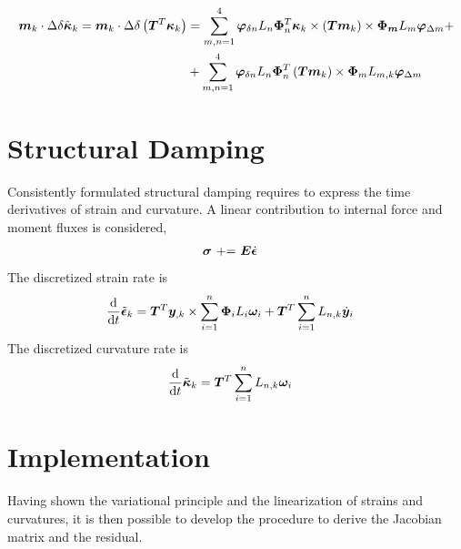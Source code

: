\begin{equation}
\begin{split}
\bm{m}_k \cdot \Delta \delta \tilde{\bm{\kappa}}_k =
\bm{m}_k \cdot \Delta \delta \left( \bm{T}^T \bm{\kappa}_k \right) & =
\sum_{m,n=1}^{4} \bm{\varphi}_{\delta n} L_n \bm{\Phi}_n^T \bm{\kappa}_k \times \left( \bm{T} \bm{m}_k \right) \times \bm{\Phi_{m}} L_m \bm{\varphi}_{\Delta m} + \\
&+\sum_{m,n=1}^{4} \bm{\varphi}_{\delta n} L_n \bm{\Phi}_n^T \left( \bm{T} \bm{m}_k \right) \times \bm{\Phi}_m L_{m,k} \bm{\varphi}_{\Delta m}
\end{split}
\label{eq:Deltadelta_k}
\end{equation}
\section{Structural Damping}
Consistently formulated structural damping requires to express
the time derivatives of strain and curvature.
A linear contribution to internal force and moment fluxes is considered,
\begin{align}
	\bm{\sigma}
	& \text{ += }
	\bm{E} \dot{\bm{\epsilon}}
\end{align}
The discretized strain rate is
\begin{align}
	\frac{\mathrm{d}}{\mathrm{d}t} \tilde{\bm{\epsilon}}_k
	&=
	\bm{T}^T \bm{y}_{,k} \times \sum_{i=1}^n \bm{\Phi}_i L_i \bm{\omega}_i
	+
	\bm{T}^T \sum_{i=1}^n L_{n,k} \dot{\bm{y}}_i
\end{align}
The discretized curvature rate is
\begin{align}
	\frac{\mathrm{d}}{\mathrm{d}t} \tilde{\bm{\kappa}}_k
	&=
	\bm{T}^T \sum_{i=1}^n L_{n,k} \bm{\omega}_i
\end{align}

\section{Implementation}
Having shown the variational principle and the linearization of strains and curvatures, it is then possible to develop the procedure to derive the Jacobian matrix and the residual.
